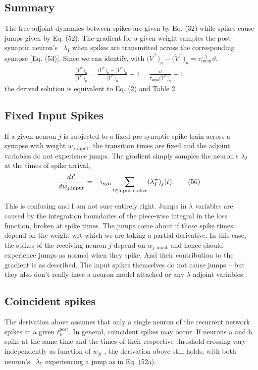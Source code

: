 \documentclass[a4paper]{article}
\newcommand{\blue}[1]{{\color{blue}#1}}
\begin{document}
\blue{
  \subsection{Summary}
  The free adjoint dynamics between spikes are given by Eq. (32) while
  spikes cause jumps given by Eq. (52). The gradient for a given
  weight samples the post-synaptic neuron's  $\lambda_I$ when spikes are
  transmitted across the corresponding synapse [Eq. (53)]. Since we
  can identify, with $\big(\dot{V}^+\big)_n - \big(\dot{V}^-\big)_n =
  \tau_{\text{mem}}^{-1} \vartheta$,
  \begin{align}
    \frac{\big(\dot{V}^+\big)_n}{\big(\dot{V}^-\big)_n} =
    \frac{\big(\dot{V}^+\big)_n -
      \big(\dot{V}^-\big)_n}{\big(\dot{V}^-\big)_n} + 1 =
    \frac{\vartheta}{\tau_{\text{mem}} \big(\dot{V}^-\big)_n} + 1
    \tag{55}
  \end{align}
  the derived solution is equivalent to Eq. (2) and Table 2.

  \subsection{Fixed Input Spikes}
  If a given neuron $j$ is subjected to a fixed pre-synaptic spike train across a synapse with
weight $w_{j,\text{input}}$, the transition times are fixed and the adjoint
variables do not experience jumps. The gradient 
simply samples the neuron’s $\lambda_I$ at the times of spike arrival,
\begin{align}
  \frac{d \cal L}{d w_{j,\text{input}}} = - \tau_{\text{syn}}
  \sum_{t \in \text{input spikes}} (\lambda_I^+)_j(t) . \tag{56}
\end{align}
}
This is confusing and I am not sure entirely right. Jumps in $\lambda$
variables are caused by the integration boundaries of the piece-wise
integral in the loss function, broken at spike times. The jumps come
about if those spike times depend on the weight wrt which we are
taking a partial derivative. In this case, the spikes of the receiving
neuron $j$ depend on $w_{j,\text{input}}$ and hence should experience
jumps as normal when they spike. And their contribution to the
gradient is as described. The input spikes themselves do not cause
jumps -- but they also don't really have a neuron model attached or
any $\lambda$ adjoint variables. 
\blue{
\subsection{Coincident spikes}
The derivation above assumes that only a single neuron of the
recurrent network spikes at a given $t_k^{\text{post}}$. In general,
coincident spikes may occur. If neurons a and b spike at the same time
and the times of their respective threshold crossing vary
independently as function of $w_{ji}$ , the derivation above still
holds, with both neuron’s  $\lambda_V$ experiencing a jump as in
Eq. (52a).
}
\end{document}
